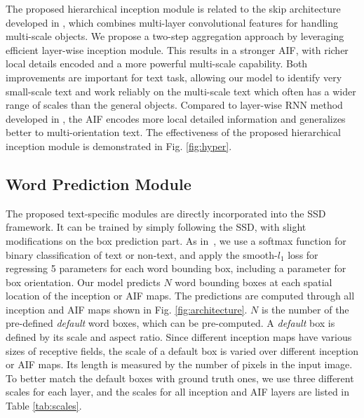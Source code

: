 \documentclass[10pt,twocolumn,letterpaper]{article}
\begin{document}
The proposed hierarchical inception module is related to the skip architecture developed in \cite{Long2015}, which combines multi-layer convolutional features for handling multi-scale objects. We propose a two-step aggregation approach by leveraging efficient layer-wise inception module. This results in a stronger AIF, with richer local details encoded and a more powerful multi-scale capability. Both improvements are important for text task, allowing our model to identify very small-scale text and work reliably on the multi-scale text which often has a wider range of scales than the general objects.  Compared to layer-wise RNN method developed in \cite{Tian2016}, the AIF encodes more local detailed information and generalizes better to multi-orientation text. The effectiveness of the proposed hierarchical inception module is demonstrated in Fig. \ref{fig:hyper}.

\subsection{Word Prediction Module}
The proposed text-specific modules are directly incorporated into the SSD framework. It can be trained by simply following the SSD, with slight modifications on the box prediction part. As in~\cite{liu2016SSD}, we use a softmax function for binary classification of text or non-text,  and apply the smooth-$l_1$ loss for regressing 5 parameters for each word bounding box, including a parameter for box orientation. Our model predicts $N$ word bounding boxes at each spatial location of the inception or AIF maps. The predictions are computed through all inception and AIF maps shown in Fig. \ref{fig:architecture}.  $N$ is the number of the pre-defined \textit{default} word boxes, which can be pre-computed. A \textit{default} box is defined by its scale and aspect ratio. Since different inception maps have various sizes of receptive fields, the scale of a default box is varied over different inception or AIF maps. Its length is measured by the number of pixels in the input image. To better match the default boxes with ground truth ones, we use three different scales for each layer, and the scales for all inception and AIF layers are listed in Table  \ref{tab:scales}.
\end{document}
